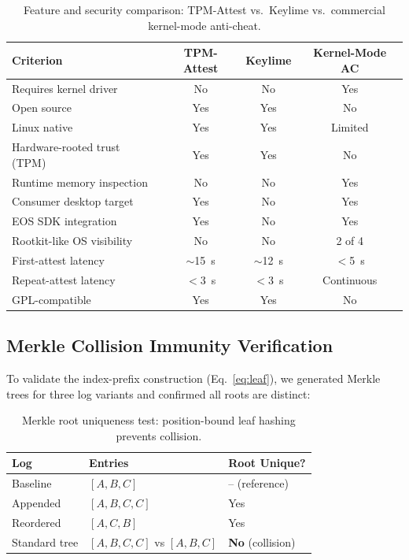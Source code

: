\documentclass[11pt]{article}
\begin{document}
\begin{table}[h]
\centering
\caption{Feature and security comparison: TPM-Attest vs.\ Keylime vs.\ commercial kernel-mode anti-cheat.}
\label{tab:comparison}
\renewcommand{\arraystretch}{1.25}
\begin{tabular}{@{}p{4.2cm}ccc@{}}
\toprule
\textbf{Criterion} & \textbf{TPM-Attest} & \textbf{Keylime} & \textbf{Kernel-Mode AC} \\
\midrule
Requires kernel driver        & No  & No  & Yes \\
Open source                   & Yes & Yes & No  \\
Linux native                  & Yes & Yes & Limited \\
Hardware-rooted trust (TPM)   & Yes & Yes & No  \\
Runtime memory inspection     & No  & No  & Yes \\
Consumer desktop target       & Yes & No  & Yes \\
EOS SDK integration           & Yes & No  & Yes \\
Rootkit-like OS visibility~\cite{dorner2024rootkit} & No & No & 2 of 4 \\
First-attest latency          & $\sim$15~s & $\sim$12~s & $<$5~s \\
Repeat-attest latency         & $<$3~s & $<$3~s & Continuous \\
GPL-compatible                & Yes & Yes & No  \\
\bottomrule
\end{tabular}
\end{table}

\subsection{Merkle Collision Immunity Verification}

To validate the index-prefix construction (Eq.~\ref{eq:leaf}), we generated Merkle trees for three log variants and confirmed all roots are distinct:

\begin{table}[h]
\centering
\caption{Merkle root uniqueness test: position-bound leaf hashing prevents collision.}
\label{tab:merkle}
\begin{tabular}{@{}lll@{}}
\toprule
\textbf{Log} & \textbf{Entries} & \textbf{Root Unique?} \\
\midrule
Baseline        & $[A, B, C]$    & -- (reference) \\
Appended        & $[A, B, C, C]$ & Yes \\
Reordered       & $[A, C, B]$    & Yes \\
Standard tree   & $[A, B, C, C]$ vs $[A,B,C]$ & \textbf{No} (collision) \\
\bottomrule
\end{tabular}
\end{table}
\end{document}
